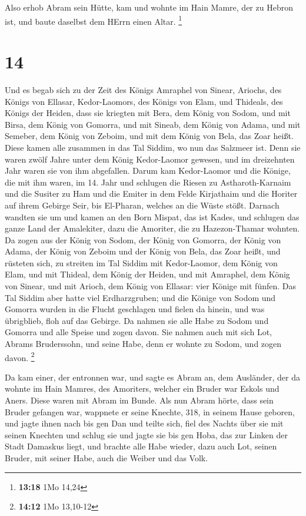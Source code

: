  Also erhob Abram sein Hütte, kam und wohnte im Hain Mamre,
der zu Hebron ist, und baute daselbst dem HErrn einen Altar. \footnote{\textbf{13:18}
  1Mo 14,24}

\hypertarget{section-3}{%
\section{14}\label{section-3}}

 Und es begab sich zu der Zeit des Königs Amraphel von
Sinear, Ariochs, des Königs von Ellasar, Kedor-Laomors, des Königs von
Elam, und Thideals, des Königs der Heiden,  dass sie
kriegten mit Bera, dem König von Sodom, und mit Birsa, dem König von
Gomorra, und mit Sineab, dem König von Adama, und mit Semeber, dem König
von Zeboim, und mit dem König von Bela, das Zoar heißt. 
Diese kamen alle zusammen in das Tal Siddim, wo nun das Salzmeer ist.
 Denn sie waren zwölf Jahre unter dem König Kedor-Laomor
gewesen, und im dreizehnten Jahr waren sie von ihm abgefallen.
 Darum kam Kedor-Laomor und die Könige, die mit ihm waren,
im 14. Jahr und schlugen die Riesen zu Astharoth-Karnaim und die Susiter
zu Ham und die Emiter in dem Felde Kirjathaim  und die
Horiter auf ihrem Gebirge Seir, bis El-Pharan, welches an die Wüste
stößt.  Darnach wandten sie um und kamen an den Born Mispat,
das ist Kades, und schlugen das ganze Land der Amalekiter, dazu die
Amoriter, die zu Hazezon-Thamar wohnten.  Da zogen aus der
König von Sodom, der König von Gomorra, der König von Adama, der König
von Zeboim und der König von Bela, das Zoar heißt, und rüsteten sich, zu
streiten im Tal Siddim  mit Kedor-Laomor, dem König von
Elam, und mit Thideal, dem König der Heiden, und mit Amraphel, dem König
von Sinear, und mit Arioch, dem König von Ellasar: vier Könige mit
fünfen.  Das Tal Siddim aber hatte viel Erdharzgruben; und
die Könige von Sodom und Gomorra wurden in die Flucht geschlagen und
fielen da hinein, und was übrigblieb, floh auf das Gebirge.
 Da nahmen sie alle Habe zu Sodom und Gomorra und alle
Speise und zogen davon.  Sie nahmen auch mit sich Lot,
Abrams Bruderssohn, und seine Habe, denn er wohnte zu Sodom, und zogen
davon. \footnote{\textbf{14:12} 1Mo 13,10-12}

 Da kam einer, der entronnen war, und sagte es Abram an,
dem Ausländer, der da wohnte im Hain Mamres, des Amoriters, welcher ein
Bruder war Eskols und Aners. Diese waren mit Abram im Bunde.
 Als nun Abram hörte, dass sein Bruder gefangen war,
wappnete er seine Knechte, 318, in seinem Hause geboren, und jagte ihnen
nach bis gen Dan  und teilte sich, fiel des Nachts über sie
mit seinen Knechten und schlug sie und jagte sie bis gen Hoba, das zur
Linken der Stadt Damaskus liegt,  und brachte alle Habe
wieder, dazu auch Lot, seinen Bruder, mit seiner Habe, auch die Weiber
und das Volk.

